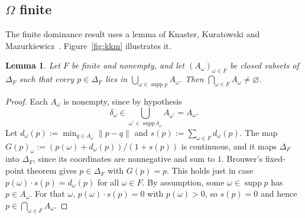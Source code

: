 \documentclass[11pt]{article}
\newtheorem{lemma}[theorem]{Lemma}
\theoremstyle{definition}
\theoremstyle{remark}
\newcommand{\supp}{\operatorname{supp}}
\begin{document}
\subsection{\texorpdfstring{$\Omega$}{Omega} finite}\label{sec:kkm}
The finite dominance result uses a lemma of Knaster, Kuratowski and Mazurkiewicz~\cite{KKM}. Figure~\ref{fig:kkm} illustrates it.

\begin{lemma}\label{lem:kkm}
Let $F$ be finite and nonempty, and let $(A_\omega)_{\omega\in F}$ be closed subsets of $\Delta_F$ such that every $p\in\Delta_F$ lies in $\bigcup_{\omega\in\supp p}A_\omega$. Then $\bigcap_{\omega\in F}A_\omega\ne\varnothing$.
\end{lemma}
\begin{proof}
Each $A_\omega$ is nonempty, since by hypothesis
\[
\delta_\omega\in\bigcup_{\omega^\prime\in\supp \delta_\omega}A_{\omega^\prime}=A_\omega.
\]
Let $d_\omega(p):=\min_{q\in A_\omega}\lVert p-q \rVert$ and $s(p):=\sum_{\omega\in F} d_\omega(p)$. The map $G(p)_\omega:=(p(\omega)+d_\omega(p))/(1+s(p))$ is continuous, and it maps $\Delta_F$ into $\Delta_F$, since its coordinates are nonnegative and sum to $1$. Brouwer's fixed-point theorem gives $p\in\Delta_F$ with $G(p)=p$. This holds just in case $p(\omega)\cdot s(p)=d_\omega(p)$ for all $\omega\in F$. By assumption, some $\omega\in\supp p$ has $p\in A_\omega$. For that $\omega$, $p(\omega)\cdot s(p)=0$ with $p(\omega)>0$, so $s(p)=0$ and hence $p\in\bigcap_{\omega\in F}A_\omega$.
\end{proof}
\end{document}

